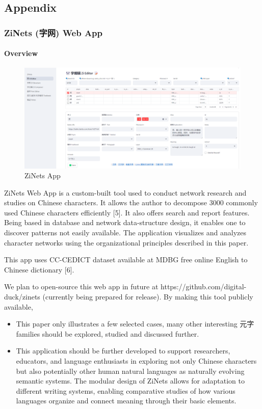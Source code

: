 \documentclass[
  11pt,
  letterpaper,
]{article}
\providecommand{\tightlist}{%
  \setlength{\itemsep}{0pt}\setlength{\parskip}{0pt}}
\begin{document}
\hypertarget{appendix}{%
\subsection{Appendix}\label{appendix}}

\hypertarget{zinets-ux5b57ux7f51-web-app}{%
\subsubsection{ZiNets (字网) Web
App}\label{zinets-ux5b57ux7f51-web-app}}

\hypertarget{overview}{%
\paragraph{Overview}\label{overview}}

\begin{figure}
\centering
\includegraphics{./images/app_zinets.png}
\caption{ZiNets App}
\end{figure}

ZiNets Web App is a custom-built tool used to conduct network research
and studies on Chinese characters. It allows the author to decompose
3000 commonly used Chinese characters efficiently {[}5{]}. It also
offers search and report features. Being based in database and network
data-structure design, it enables one to discover patterns not easily
available. The application visualizes and analyzes character networks
using the organizational principles described in this paper.

This app uses CC-CEDICT dataset available at MDBG free online English to
Chinese dictionary {[}6{]}.

We plan to open-source this web app in future at
https://github.com/digital-duck/zinets (currently being prepared for
release). By making this tool publicly available,

\begin{itemize}
\tightlist
\item
  This paper only illustrates a few selected cases, many other
  interesting 元字 families should be explored, studied and discussed
  further.
\item
  This application should be further developed to support researchers,
  educators, and language enthusiasts in exploring not only Chinese
  characters but also potentially other human natural languages as
  naturally evolving semantic systems. The modular design of ZiNets
  allows for adaptation to different writing systems, enabling
  comparative studies of how various languages organize and connect
  meaning through their basic elements.
\end{itemize}
\end{document}
